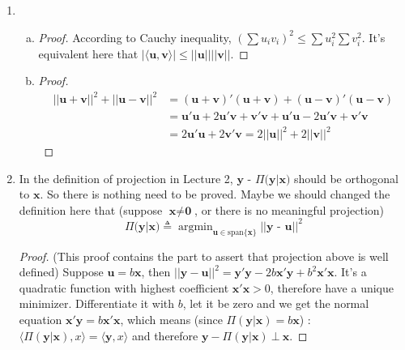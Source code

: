 \documentclass[12pt]{article}
\DeclareMathOperator*{\argmin}{argmin}
\begin{document}
\begin{enumerate}
\begin{proof}
        Now we get $W^\bot = V$, hence dim$(W^\bot) = n-k$. Also we can see that $W^\bot$ is unique. 
        If not, we can merge the two different $W^\bot$ and get a higher dimensional subspace $Z$ that is orthogonal to $W$.
        Then $Z \oplus W \subset \mathbb{R}^n$ but dim$(Z \oplus W) \ge n+1 > n$, a contradiction. 
    \end{proof}
    \item
    \begin{enumerate}[(a)]
        \item 
        \begin{proof}
            According to Cauchy inequality, $\left(\sum u_i v_i\right)^2 \le \sum u_i^2 \sum v_i^2$. It's equivalent here that $|\langle \textbf{u}, \textbf{v} \rangle| \le ||\textbf{u}|| ||\textbf{v}||$.
        \end{proof}
        \item
        \begin{proof}
            \begin{align}
                ||\textbf{u} + \textbf{v}||^2 + ||\textbf{u} - \textbf{v}||^2 &= (\textbf{u} + \textbf{v})'(\textbf{u} + \textbf{v}) + (\textbf{u} - \textbf{v})'(\textbf{u} - \textbf{v}) \\
                                                                              &= \textbf{u}'\textbf{u} + 2 \textbf{u}'\textbf{v} + \textbf{v}'\textbf{v} + \textbf{u}'\textbf{u} - 2 \textbf{u}'\textbf{v} + \textbf{v}'\textbf{v} \\
                                                                              &= 2 \textbf{u}'\textbf{u} + 2 \textbf{v}'\textbf{v} = 2 ||\textbf{u}||^2 + 2 ||\textbf{v}||^2
            \end{align}
        \end{proof}
    \end{enumerate}
    \item
    In the definition of projection in Lecture 2, $\textbf{y - $\Pi$(y$|$x)}$ should be orthogonal to $\textbf{x}$. So there is nothing need to be proved. 
    Maybe we should changed the definition here that (suppose $\textbf{x} \neq \textbf{0}$, or there is no meaningful projection)
    $$\Pi\textbf{(y$|$x)} \triangleq \argmin_{\textbf{u} \in \text{span}\{\textbf{x}\}} ||\textbf{y - u}||^2$$
    \begin{proof}
        (This proof contains the part to assert that projection above is well defined)
        Suppose $\textbf{u} = b \textbf{x}$, then $||\textbf{y} - \textbf{u}||^2 = \textbf{y}'\textbf{y} - 2 b \textbf{x}'\textbf{y} + b^2 \textbf{x}'\textbf{x}$.
        It's a quadratic function with highest coefficient $\textbf{x}'\textbf{x} > 0$, therefore have a unique minimizer.
        Differentiate it with $b$, let it be zero and we get the normal equation $\textbf{x}'\textbf{y} = b \textbf{x}'\textbf{x}$,
        which means (since $\Pi(\textbf{y$|$x}) = b \textbf{x}$) : $\langle \Pi(\textbf{y$|$x}), x \rangle = \langle \textbf{y}, x \rangle$ and therefore $\textbf{y} - \Pi(\textbf{y$|$x}) \  \bot \ \textbf{x}$.
    \end{proof}
\end{enumerate}
\end{document}
